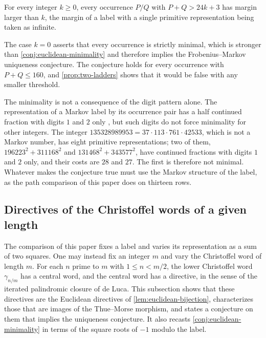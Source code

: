 \begin{conjecture}\label{conj:thresholds}
For every integer $k\geqslant0$, every occurrence $P/Q$ with $P+Q>24k+3$ has
margin larger than $k$, the margin of a label with a single primitive
representation being taken as infinite.
\end{conjecture}

The case $k=0$ asserts that every occurrence is strictly minimal, which is
stronger than \cref{conj:euclidean-minimality} and therefore implies the
Frobenius--Markov uniqueness conjecture. The conjecture holds for every
occurrence with $P+Q\leqslant160$, and \cref{prop:two-ladders} shows that it
would be false with any smaller threshold.

The minimality is not a consequence of the digit pattern alone. The
representation of a Markov label by its occurrence pair has a half continued
fraction with digits $1$ and $2$ only \cite[Corollary~4.4]{CanakciSchiffler2020},
but such digits do not force minimality for other integers. The integer
$135328989953=37\cdot113\cdot761\cdot42533$, which is not a Markov number,
has eight primitive representations; two of them,
$196223^2+311168^2$ and $131468^2+343577^2$, have continued fractions with
digits $1$ and $2$ only, and their costs are $28$ and $27$. The first is
therefore not minimal. Whatever makes the conjecture true must use the
Markov structure of the label, as the path comparison of this paper does on
thirteen rows.

\subsection{Directives of the Christoffel words of a given length}\label{sec:directives}

The comparison of this paper fixes a label and varies its representation as
a sum of two squares. One may instead fix an integer $m$ and vary the
Christoffel word of length $m$. For each $n$ prime to $m$ with $1\leqslant n<m/2$,
the lower Christoffel word $\gamma_{n/m}$ has a central word, and the central
word has a directive, in the sense of the iterated palindromic closure of de
Luca. This subsection shows that these directives are the Euclidean
directives of \cref{lem:euclidean-bijection}, characterizes those that are
images of the Thue--Morse morphism, and states a conjecture on them that
implies the uniqueness conjecture. It also recasts
\cref{conj:euclidean-minimality} in terms of the square roots of $-1$ modulo
the label.

